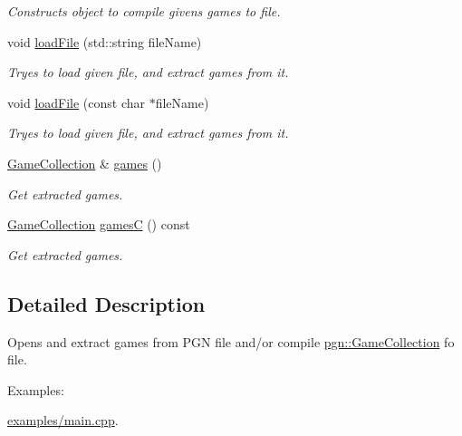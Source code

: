 \begin{DoxyCompactItemize}
\begin{DoxyCompactList}\small\item\em Constructs object to compile givens games to file. \item\end{DoxyCompactList}\item 
void \hyperlink{classpgn_1_1File_a65640d8264639b0dc36f9def9f70857c}{loadFile} (std::string fileName)
\begin{DoxyCompactList}\small\item\em Tryes to load given file, and extract games from it. \item\end{DoxyCompactList}\item 
void \hyperlink{classpgn_1_1File_a1258aa5503f4c1fc9f7f4cbea089d441}{loadFile} (const char $\ast$fileName)
\begin{DoxyCompactList}\small\item\em Tryes to load given file, and extract games from it. \item\end{DoxyCompactList}\item 
\hyperlink{classpgn_1_1GameCollection}{GameCollection} \& \hyperlink{classpgn_1_1File_ae81effcddf6d9cc6693aff0c26d846fe}{games} ()
\begin{DoxyCompactList}\small\item\em Get extracted games. \item\end{DoxyCompactList}\item 
\hyperlink{classpgn_1_1GameCollection}{GameCollection} \hyperlink{classpgn_1_1File_a754d1e7edb38225f8c154c1de10de61f}{gamesC} () const 
\begin{DoxyCompactList}\small\item\em Get extracted games. \item\end{DoxyCompactList}\end{DoxyCompactItemize}


\subsection{Detailed Description}
Opens and extract games from PGN file and/or compile \hyperlink{classpgn_1_1GameCollection}{pgn::GameCollection} fo file. \begin{Desc}
\item[Examples: ]\par


\hyperlink{examples_2main_8cpp-example}{examples/main.cpp}.

\end{Desc}


